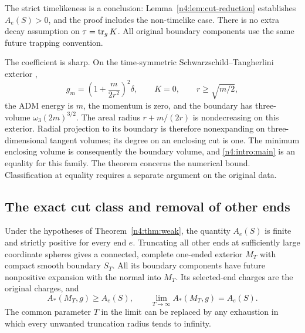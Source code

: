 The strict timelikeness is a conclusion: Lemma~\ref{n4:lem:cut-reduction}
establishes \(A_e(S)>0\), and the proof includes the non-timelike case.
There is no extra decay assumption on \(\tau=\operatorname{tr}_gK\).
All original boundary components use the same future trapping convention.

The coefficient is sharp. On the time-symmetric
Schwarzschild--Tangherlini exterior \cite{Tangherlini1963},
\[
 g_m=\left(1+\frac{m}{2r^2}\right)^2\delta,\qquad
 K=0,\qquad r\ge\sqrt{m/2},
\]
the ADM energy is \(m\), the momentum is zero, and the boundary
has three-volume \(\omega_3(2m)^{3/2}\).
The areal radius \(r+m/(2r)\) is nondecreasing on this exterior.
Radial projection to its boundary is therefore nonexpanding on
three-dimensional tangent volumes; its degree on an enclosing cut is one.
The minimum enclosing volume is consequently the boundary volume,
and \eqref{n4:intro:main} is an equality for this family.
The theorem concerns the numerical bound. Classification at equality
requires a separate argument on the original data.

\subsection{The exact cut class and removal of other ends}

\begin{lemma}\label{n4:lem:cut-reduction}
Under the hypotheses of Theorem~\ref{n4:thm:weak}, the quantity \(A_e(S)\)
is finite and strictly positive for every end \(e\).
Truncating all other ends at sufficiently large coordinate spheres gives
a connected, complete one-ended exterior \(M_T\) with compact smooth
boundary \(S_T\). All its boundary components have future nonpositive
expansion with the normal into \(M_T\). Its selected-end charges are the
original charges, and
\begin{equation}\label{n4:end:cut-truncation}
 A_*(M_T,g)\ge A_e(S),\qquad
 \lim_{T\to\infty}A_*(M_T,g)=A_e(S).
\end{equation}
The common parameter \(T\) in the limit can be replaced by any exhaustion
in which every unwanted truncation radius tends to infinity.
\end{lemma}

